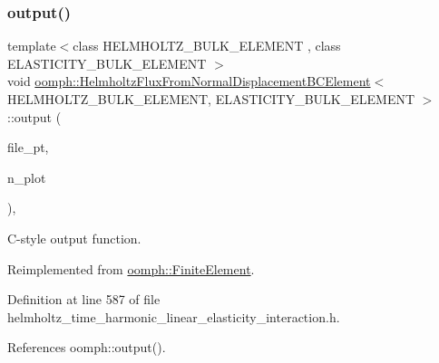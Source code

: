 \subsubsection{\texorpdfstring{output()}{output()}\hspace{0.1cm}{\footnotesize\ttfamily [4/4]}}
{\footnotesize\ttfamily template$<$class H\+E\+L\+M\+H\+O\+L\+T\+Z\+\_\+\+B\+U\+L\+K\+\_\+\+E\+L\+E\+M\+E\+NT , class E\+L\+A\+S\+T\+I\+C\+I\+T\+Y\+\_\+\+B\+U\+L\+K\+\_\+\+E\+L\+E\+M\+E\+NT $>$ \\
void \hyperlink{classoomph_1_1HelmholtzFluxFromNormalDisplacementBCElement}{oomph\+::\+Helmholtz\+Flux\+From\+Normal\+Displacement\+B\+C\+Element}$<$ H\+E\+L\+M\+H\+O\+L\+T\+Z\+\_\+\+B\+U\+L\+K\+\_\+\+E\+L\+E\+M\+E\+NT, E\+L\+A\+S\+T\+I\+C\+I\+T\+Y\+\_\+\+B\+U\+L\+K\+\_\+\+E\+L\+E\+M\+E\+NT $>$\+::output (\begin{DoxyParamCaption}\item[{F\+I\+LE $\ast$}]{file\+\_\+pt,  }\item[{const unsigned \&}]{n\+\_\+plot }\end{DoxyParamCaption})\hspace{0.3cm}{\ttfamily [inline]}, {\ttfamily [virtual]}}



C-\/style output function. 



Reimplemented from \hyperlink{classoomph_1_1FiniteElement_adfaee690bb0608f03320eeb9d110d48c}{oomph\+::\+Finite\+Element}.



Definition at line 587 of file helmholtz\+\_\+time\+\_\+harmonic\+\_\+linear\+\_\+elasticity\+\_\+interaction.\+h.



References oomph\+::output().

\mbox{\label{classoomph_1_1HelmholtzFluxFromNormalDisplacementBCElement_a91ee0e36a8c127d83269a08d6740dfb2}} 
